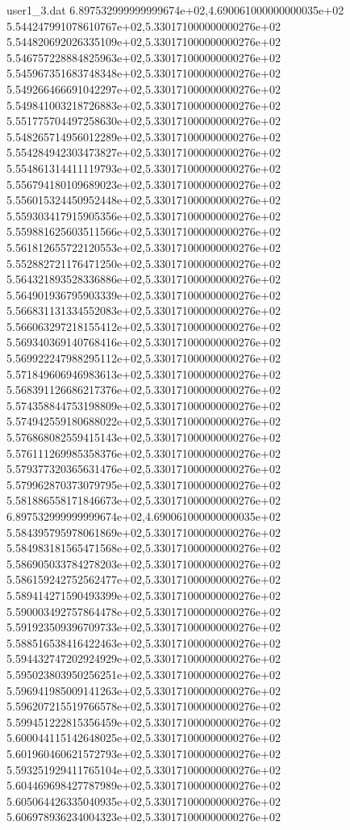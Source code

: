 \begin{filecontents}{user1_3.dat}
6.897532999999999674e+02,4.690061000000000035e+02
5.544247991078610767e+02,5.330171000000000276e+02
5.544820692026335109e+02,5.330171000000000276e+02
5.546757228884825963e+02,5.330171000000000276e+02
5.545967351683748348e+02,5.330171000000000276e+02
5.549266466691042297e+02,5.330171000000000276e+02
5.549841003218726883e+02,5.330171000000000276e+02
5.551775704497258630e+02,5.330171000000000276e+02
5.548265714956012289e+02,5.330171000000000276e+02
5.554284942303473827e+02,5.330171000000000276e+02
5.554861314411119793e+02,5.330171000000000276e+02
5.556794180109689023e+02,5.330171000000000276e+02
5.556015324450952448e+02,5.330171000000000276e+02
5.559303417915905356e+02,5.330171000000000276e+02
5.559881625603511566e+02,5.330171000000000276e+02
5.561812655722120553e+02,5.330171000000000276e+02
5.552882721176471250e+02,5.330171000000000276e+02
5.564321893528336886e+02,5.330171000000000276e+02
5.564901936795903339e+02,5.330171000000000276e+02
5.566831131334552083e+02,5.330171000000000276e+02
5.566063297218155412e+02,5.330171000000000276e+02
5.569340369140768416e+02,5.330171000000000276e+02
5.569922247988295112e+02,5.330171000000000276e+02
5.571849606946983613e+02,5.330171000000000276e+02
5.568391126686217376e+02,5.330171000000000276e+02
5.574358844753198809e+02,5.330171000000000276e+02
5.574942559180688022e+02,5.330171000000000276e+02
5.576868082559415143e+02,5.330171000000000276e+02
5.576111269985358376e+02,5.330171000000000276e+02
5.579377320365631476e+02,5.330171000000000276e+02
5.579962870373079795e+02,5.330171000000000276e+02
5.581886558171846673e+02,5.330171000000000276e+02
6.897532999999999674e+02,4.690061000000000035e+02
5.584395795978061869e+02,5.330171000000000276e+02
5.584983181565471568e+02,5.330171000000000276e+02
5.586905033784278203e+02,5.330171000000000276e+02
5.586159242752562477e+02,5.330171000000000276e+02
5.589414271590493399e+02,5.330171000000000276e+02
5.590003492757864478e+02,5.330171000000000276e+02
5.591923509396709733e+02,5.330171000000000276e+02
5.588516538416422463e+02,5.330171000000000276e+02
5.594432747202924929e+02,5.330171000000000276e+02
5.595023803950256251e+02,5.330171000000000276e+02
5.596941985009141263e+02,5.330171000000000276e+02
5.596207215519766578e+02,5.330171000000000276e+02
5.599451222815356459e+02,5.330171000000000276e+02
5.600044115142648025e+02,5.330171000000000276e+02
5.601960460621572793e+02,5.330171000000000276e+02
5.593251929411765104e+02,5.330171000000000276e+02
5.604469698427787989e+02,5.330171000000000276e+02
5.605064426335040935e+02,5.330171000000000276e+02
5.606978936234004323e+02,5.330171000000000276e+02

\end{filecontents}
